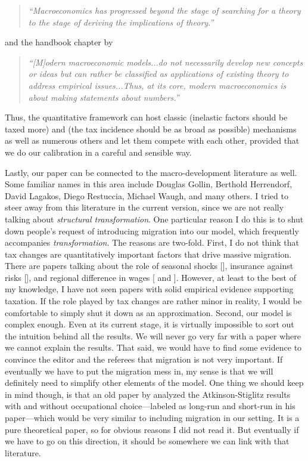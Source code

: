 \documentclass[twoside,11pt,leqno]{article}
\begin{document}
\begin{quote}
\textit{``Macroeconomics has progressed beyond the stage of searching for a theory to the stage of deriving the implications of theory.''}
\end{quote}
and the handbook chapter by \citet{HasslerKrusell:2018}
\begin{quote}
\textit{``[M]odern macroeconomic models...do not necessarily develop new concepts or ideas but can rather be classified as applications of existing theory to address empirical issues...Thus, at its core, modern macroeconomics is about making statements about numbers.''}
\end{quote}
Thus, the quantitative framework can host classic \citet{Ramsey:1927} (inelastic factors should be taxed more) and \citet{Harberger:1962} (the tax incidence should be as broad as possible) mechanisms as well as numerous others and let them compete with each other, provided that we do our calibration in a careful and sensible way.

Lastly, our paper can be connected to the macro-development literature as well. Some familiar names in this area include Douglas Gollin, Berthold Herrendorf, David Lagakos, Diego Restuccia, Michael Waugh, and many others. I tried to steer away from this literature in the current version, since we are not really talking about \textit{structural transformation}. One particular reason I do this is to shut down people's request of introducing migration into our model, which frequently accompanies \textit{transformation}. The reasons are two-fold. First, I do not think that tax changes are quantitatively important factors that drive massive migration. There are papers talking about the role of seasonal shocks [\citet{Lagakosetal:2017}], insurance against risks [\citet{Morten:2018}], and regional difference in wages [\citet{HarrisTodaro:1970} and \citet{BryanMorten:2019}]. However, at least to the best of my knowledge, I have not seen papers with solid empirical evidence supporting taxation. If the role played by tax changes are rather minor in reality, I would be comfortable to simply shut it down as an approximation. Second, our model is complex enough. Even at its current stage, it is virtually impossible to sort out the intuition behind all the results. We will never go very far with a paper where we cannot explain the results. That said, we would have to find some evidence to convince the editor and the referees that migration is not very important. If eventually we have to put the migration mess in, my sense is that we will definitely need to simplify other elements of the model. One thing we should keep in mind though, is that an old paper by \citet{Saez:2004} analyzed the Atkinson-Stiglitz results with and without occupational choice---labeled as long-run and short-run in his paper---which would be very similar to including migration in our setting. It is a pure theoretical paper, so for obvious reasons I did not read it. But eventually if we have to go on this direction, it should be somewhere we can link with that literature.
\end{document}
